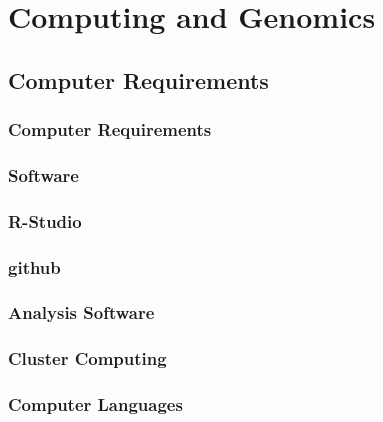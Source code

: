 \documentclass{beamer}
\begin{document}
\section{Computing and Genomics}
\subsection{Computer Requirements}
\begin{frame}
\frametitle{Computer Requirements}
\end{frame}
\begin{frame}
\frametitle{Software}
\end{frame}
\begin{frame}
\frametitle{R-Studio}
%
\end{frame}
\begin{frame}
\frametitle{github}
%
\end{frame}
\begin{frame}
\frametitle{Analysis Software}
\end{frame}
\begin{frame}
\frametitle{Cluster Computing}
%
\end{frame}
\begin{frame}
\frametitle{Computer Languages}
%
\end{frame}





\end{document}
